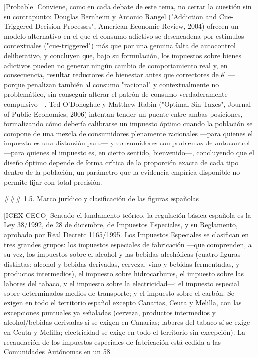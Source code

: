 \documentclass[10pt,a4paper]{article}
\begin{document}
[Probable] Conviene, como en cada debate de este tema, no cerrar la cuestión sin su contrapunto: Douglas Bernheim y Antonio Rangel ("Addiction and Cue-Triggered Decision Processes", American Economic Review, 2004) ofrecen un modelo alternativo en el que el consumo adictivo se desencadena por estímulos contextuales ("cue-triggered") más que por una genuina falta de autocontrol deliberativo, y concluyen que, bajo su formulación, los impuestos sobre bienes adictivos pueden no generar ningún cambio de comportamiento real y, en consecuencia, resultar reductores de bienestar antes que correctores de él —porque penalizan también al consumo "racional" y contextualmente no problemático, sin conseguir alterar el patrón de consumo verdaderamente compulsivo—. Ted O'Donoghue y Matthew Rabin ("Optimal Sin Taxes", Journal of Public Economics, 2006) intentan tender un puente entre ambas posiciones, formalizando cómo debería calibrarse un impuesto óptimo cuando la población se compone de una mezcla de consumidores plenamente racionales —para quienes el impuesto es una distorsión pura— y consumidores con problemas de autocontrol —para quienes el impuesto es, en cierto sentido, bienvenido—, concluyendo que el diseño óptimo depende de forma crítica de la proporción exacta de cada tipo dentro de la población, un parámetro que la evidencia empírica disponible no permite fijar con total precisión.

### 1.5. Marco jurídico y clasificación de las figuras españolas

[ICEX-CECO] Sentado el fundamento teórico, la regulación básica española es la Ley 38/1992, de 28 de diciembre, de Impuestos Especiales, y su Reglamento, aprobado por Real Decreto 1165/1995. Los Impuestos Especiales se clasifican en tres grandes grupos: los impuestos especiales de fabricación —que comprenden, a su vez, los impuestos sobre el alcohol y las bebidas alcohólicas (cuatro figuras distintas: alcohol y bebidas derivadas, cerveza, vino y bebidas fermentadas, y productos intermedios), el impuesto sobre hidrocarburos, el impuesto sobre las labores del tabaco, y el impuesto sobre la electricidad—; el impuesto especial sobre determinados medios de transporte; y el impuesto sobre el carbón. Se exigen en todo el territorio español excepto Canarias, Ceuta y Melilla, con las excepciones puntuales ya señaladas (cerveza, productos intermedios y alcohol/bebidas derivadas sí se exigen en Canarias; labores del tabaco sí se exige en Ceuta y Melilla; electricidad se exige en todo el territorio sin excepción). La recaudación de los impuestos especiales de fabricación está cedida a las Comunidades Autónomas en un 58%
\end{document}
